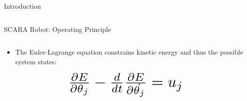 \documentclass[final]{beamer}
\begin{document}
\begin{frame}{}
{\begin{columns}[t]
\begin{column}{.30\linewidth}
\begin{block}{\centering Introduction}
\begin{columns}[T]
\end{columns}
 
\end{block}
                
                

\begin{block}{\centering SCARA Robot: Operating Principle} 


\begin{columns}[T]
\begin{column}{16cm}{}

\begin{itemize}
	\item The Euler-Lagrange equation constrains kinetic energy and thus the possible system states:
\end{itemize}
	
\[ \scalebox{2.3}{$\frac{\partial E}{\partial \theta_j} - \frac{d}{dt}\frac{\partial E}{\partial \dot{\theta_j}} = u_j$}\]



\end{column}
\end{columns}
\end{block}
\end{column}
\end{columns}}
\end{frame}
\end{document}
